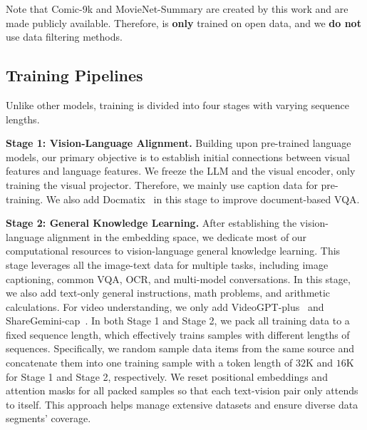 %
Note that Comic-9k and MovieNet-Summary are created by this work and are made publicly available.
%
Therefore, \OurMethod is \textbf{only} trained on open data, and we \textbf{do not} use data filtering methods.
%






\subsection{Training Pipelines}
\label{sec:Training}


%
Unlike other models, \OurMethod training is divided into four stages with varying sequence lengths.
%


    \textbf{Stage 1: Vision-Language Alignment.}
    Building upon pre-trained language models, our primary objective is to establish initial connections between visual features and language features.
    We freeze the LLM and the visual encoder, only training the visual projector.
    Therefore, we mainly use caption data for pre-training.
    We also add Docmatix~\cite{Idefics3} in this stage to improve document-based VQA.
 

    \textbf{Stage 2: General Knowledge Learning.}
    After establishing the vision-language alignment in the embedding space, we dedicate most of our computational resources to vision-language general knowledge learning.
    This stage leverages all the image-text data for multiple tasks, including image captioning, common VQA, OCR, and multi-model conversations.
    In this stage, we also add text-only general instructions, math problems, and arithmetic calculations.
    For video understanding, we only add VideoGPT-plus~\cite{VideoGPT-plus} and ShareGemini-cap~\cite{ShareGemini}.
    In both Stage 1 and Stage 2, we pack all training data to a fixed sequence length, which effectively trains samples with different lengths of sequences.
    Specifically, we random sample data items from the same source and concatenate them into one training sample with a token length of $32$K and $16$K for Stage 1 and Stage 2, respectively.
    We reset positional embeddings and attention masks for all packed samples so that each text-vision pair only attends to itself.
    This approach helps manage extensive datasets and ensure diverse data segments' coverage.

